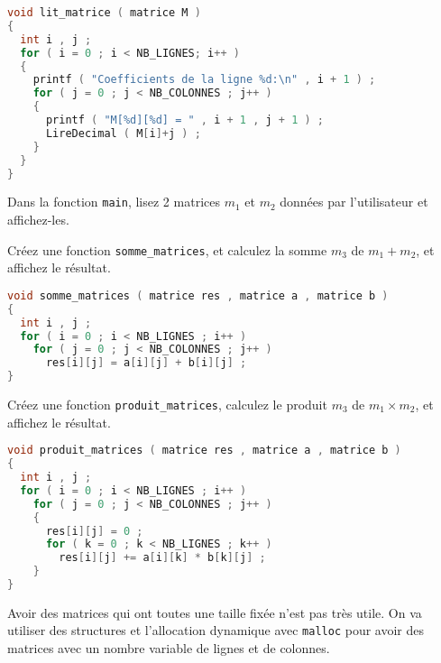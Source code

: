 \begin{solution}
  \begin{lstlisting}[language=C]
void lit_matrice ( matrice M )
{
  int i , j ;
  for ( i = 0 ; i < NB_LIGNES; i++ )
  {
    printf ( "Coefficients de la ligne %d:\n" , i + 1 ) ;
    for ( j = 0 ; j < NB_COLONNES ; j++ )
    {
      printf ( "M[%d][%d] = " , i + 1 , j + 1 ) ;
      LireDecimal ( M[i]+j ) ;
    }
  }
}
  \end{lstlisting}
\end{solution}

\question Dans la fonction \texttt{main}, lisez 2 matrices \(m_1\) et
\(m_2\) données par l'utilisateur et affichez-les.

\question Créez une fonction \texttt{somme\_matrices}, et calculez la
somme \(m_3\) de \(m_1+m_2\), et affichez le résultat.

\begin{solution}
  \begin{lstlisting}[language=C]
void somme_matrices ( matrice res , matrice a , matrice b )
{
  int i , j ;
  for ( i = 0 ; i < NB_LIGNES ; i++ )
    for ( j = 0 ; j < NB_COLONNES ; j++ )
      res[i][j] = a[i][j] + b[i][j] ;
}
  \end{lstlisting}
\end{solution}


\question Créez une fonction \texttt{produit\_matrices}, calculez le produit \(m_3\) de \(m_1\times m_2\), et
affichez le résultat.

\begin{solution}
  \begin{lstlisting}[language=C]
void produit_matrices ( matrice res , matrice a , matrice b )
{
  int i , j ;
  for ( i = 0 ; i < NB_LIGNES ; i++ )
    for ( j = 0 ; j < NB_COLONNES ; j++ )
    {
      res[i][j] = 0 ;
      for ( k = 0 ; k < NB_LIGNES ; k++ )
        res[i][j] += a[i][k] * b[k][j] ;
    }
}
  \end{lstlisting}
\end{solution}



\usetikzlibrary{positioning,matrix, arrows.meta}

Avoir des matrices qui ont toutes une taille fixée n'est pas très
utile. On va utiliser des structures et l'allocation dynamique avec
\texttt{malloc} pour avoir des matrices avec un nombre variable de
lignes et de colonnes.

